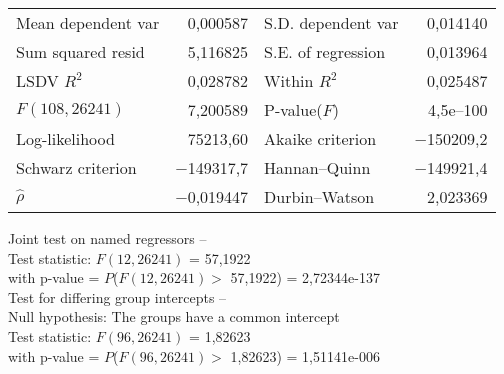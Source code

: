 \begin{center}
\vspace{1ex}
\begin{tabular}{lrlr}
Mean dependent var &  0,000587 & S.D. dependent var &  0,014140 \\
Sum squared resid &  5,116825 & S.E. of regression &  0,013964 \\
LSDV $R^2$ &  0,028782 & Within $R^2$ &  0,025487 \\
$F(108, 26241)$ &  7,200589 & P-value($F$) &  4,5\textrm{e--100} \\
Log-likelihood &  75213,60 & Akaike criterion & $-$150209,2 \\
Schwarz criterion & $-$149317,7 & Hannan--Quinn & $-$149921,4 \\
$\hat{\rho}$ & $-$0,019447 & Durbin--Watson &  2,023369 \\
\end{tabular}

\vspace{1em}
\begin{raggedright}
Joint test on named regressors --\\
\quad Test statistic: $F(12, 26241)$ = 57,1922\\
\quad with p-value = $P$($F(12, 26241) >$ 57,1922) = 2,72344e-137\\
\vspace{1ex}
Test for differing group intercepts --\\
\quad Null hypothesis: The groups have a common intercept\\
\quad Test statistic: $F(96, 26241)$ = 1,82623\\
\quad with p-value = $P$($F(96, 26241) >$ 1,82623) = 1,51141e-006\\
\vspace{1ex}
\end{raggedright}

\end{center}


